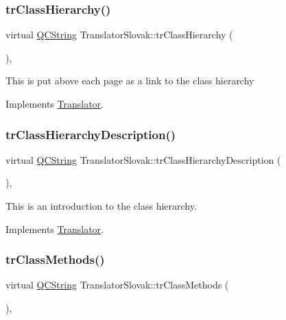 \subsubsection{\texorpdfstring{trClassHierarchy()}{trClassHierarchy()}}
{\footnotesize\ttfamily virtual \mbox{\hyperlink{class_q_c_string}{Q\+C\+String}} Translator\+Slovak\+::tr\+Class\+Hierarchy (\begin{DoxyParamCaption}{ }\end{DoxyParamCaption})\hspace{0.3cm}{\ttfamily [inline]}, {\ttfamily [virtual]}}

This is put above each page as a link to the class hierarchy 

Implements \mbox{\hyperlink{class_translator}{Translator}}.

\mbox{\label{class_translator_slovak_afd8965ccc518151c5c6a54476fc2624c}} 
\subsubsection{\texorpdfstring{trClassHierarchyDescription()}{trClassHierarchyDescription()}}
{\footnotesize\ttfamily virtual \mbox{\hyperlink{class_q_c_string}{Q\+C\+String}} Translator\+Slovak\+::tr\+Class\+Hierarchy\+Description (\begin{DoxyParamCaption}{ }\end{DoxyParamCaption})\hspace{0.3cm}{\ttfamily [inline]}, {\ttfamily [virtual]}}

This is an introduction to the class hierarchy. 

Implements \mbox{\hyperlink{class_translator}{Translator}}.

\mbox{\label{class_translator_slovak_afe9dd928ff9ea6a0b7a4b1649638504f}} 
\subsubsection{\texorpdfstring{trClassMethods()}{trClassMethods()}}
{\footnotesize\ttfamily virtual \mbox{\hyperlink{class_q_c_string}{Q\+C\+String}} Translator\+Slovak\+::tr\+Class\+Methods (\begin{DoxyParamCaption}{ }\end{DoxyParamCaption})\hspace{0.3cm}{\ttfamily [inline]}, {\ttfamily [virtual]}}

